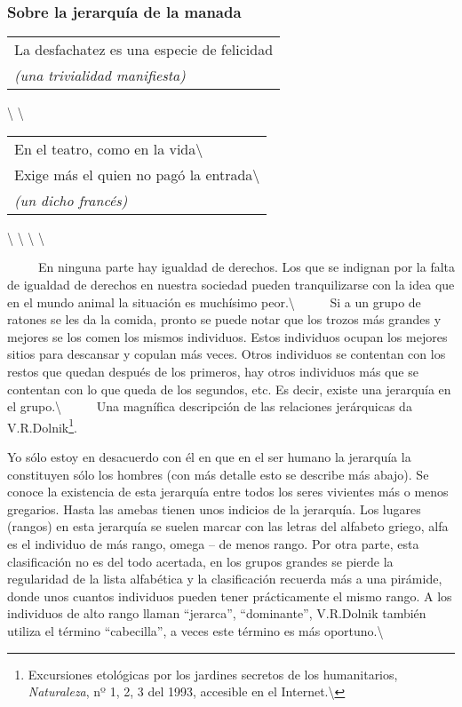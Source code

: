 \protect\hypertarget{M8}{}{}

\subsubsection{Sobre la jerarquía de la
manada}\label{sobre-la-jerarquuxeda-de-la-manada}

\begin{longtable}[]{@{}l@{}}
\toprule
La desfachatez es una especie de felicidad\tabularnewline
\emph{(una trivialidad manifiesta)}\tabularnewline
\bottomrule
\end{longtable}

\textbackslash{} \textbackslash{}

\begin{longtable}[]{@{}l@{}}
\toprule
En el teatro, como en la vida\textbackslash{}\tabularnewline
Exige más el quien no pagó la entrada\textbackslash{}\tabularnewline
\emph{(un dicho francés)}\tabularnewline
\bottomrule
\end{longtable}

\textbackslash{} \textbackslash{} \textbackslash{} \textbackslash{}

~ ~ ~ En ninguna parte hay igualdad de derechos. Los que se indignan por
la falta de igualdad de derechos en nuestra sociedad pueden
tranquilizarse con la idea que en el mundo animal la situación es
muchísimo peor.\textbackslash{} ~ ~ ~ Si a un grupo de ratones se les da
la comida, pronto se puede notar que los trozos más grandes y mejores se
los comen los mismos individuos. Estos individuos ocupan los mejores
sitios para descansar y copulan más veces. Otros individuos se contentan
con los restos que quedan después de los primeros, hay otros individuos
más que se contentan con lo que queda de los segundos, etc. Es decir,
existe una jerarquía en el grupo.\textbackslash{} ~ ~ ~ Una magnífica
descripción de las relaciones jerárquicas da V.R.Dolnik\footnote{Excursiones
  etológicas por los jardines secretos de los humanitarios,
  \emph{Naturaleza}, nº 1, 2, 3 del 1993, accesible en el
  Internet.\textbackslash{}}.

Yo sólo estoy en desacuerdo con él en que en el ser humano la jerarquía
la constituyen sólo los hombres (con más detalle esto se describe más
abajo). Se conoce la existencia de esta jerarquía entre todos los seres
vivientes más o menos gregarios. Hasta las amebas tienen unos indicios
de la jerarquía. Los lugares (rangos) en esta jerarquía se suelen marcar
con las letras del alfabeto griego, alfa es el individuo de más rango,
omega -- de menos rango. Por otra parte, esta clasificación no es del
todo acertada, en los grupos grandes se pierde la regularidad de la
lista alfabética y la clasificación recuerda más a una pirámide, donde
unos cuantos individuos pueden tener prácticamente el mismo rango. A los
individuos de alto rango llaman ``jerarca'', ``dominante'', V.R.Dolnik
también utiliza el término ``cabecilla'', a veces este término es más
oportuno.\textbackslash{}

